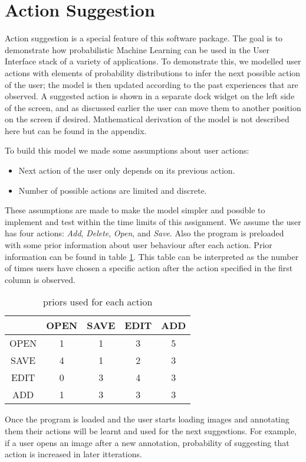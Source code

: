 \section{Action Suggestion}
Action suggestion is a special feature of this software package. The goal is to demonstrate how probabilistic Machine Learning can be used in the User Interface stack of a variety of applications. To demonstrate this, we modelled user actions with elements of probability distributions to infer the next possible action of the user; the model is then updated according to the past experiences that are observed. A suggested action is shown in a separate dock widget on the left side of the screen, and as discussed earlier the user can move them to another position on the screen if desired. Mathematical derivation of the model is not described here but can be found in the appendix.

To build this model we made some assumptions about user actions:
\begin{itemize}
\item Next action of the user only depends on its previous action.
\item Number of possible actions are limited and discrete.
\end{itemize}
These assumptions are made to make the model simpler and possible to implement and test within the time limits of this assignment. We assume the user has four actions: {\textit{Add}, \textit{Delete}, \textit{Open}, and \textit{Save}}. Also the program is preloaded with some prior information about user behaviour after each action. Prior information can be found in table \ref{tab:priors}. This table can be interpreted as the number of times users have chosen a specific action after the action specified in the first column is observed.
\begin{table}[t]
\centering
\begin{tabular}{|c|c|c|c|c|}
\hline \rule[-1ex]{0pt}{3.5ex}  & OPEN & SAVE & EDIT & ADD \\ 
\hline \rule[-1ex]{0pt}{3.5ex} OPEN & 1 & 1 & 3 & 5 \\ 
\hline \rule[-1ex]{0pt}{3.5ex} SAVE & 4 & 1 & 2 & 3 \\ 
\hline \rule[-1ex]{0pt}{3.5ex} EDIT & 0 & 3 & 4 & 3 \\ 
\hline \rule[-1ex]{0pt}{3.5ex} ADD & 1 & 3 & 3 & 3 \\ 
\hline 
\end{tabular}
\caption{priors used for each action}
\label{tab:priors}
\end{table}
Once the program is loaded and the user starts loading images and annotating them their actions will be learnt and used for the next suggestions. For example, if a user opens an image after a new annotation, probability of suggesting that action is increased in later itterations.

